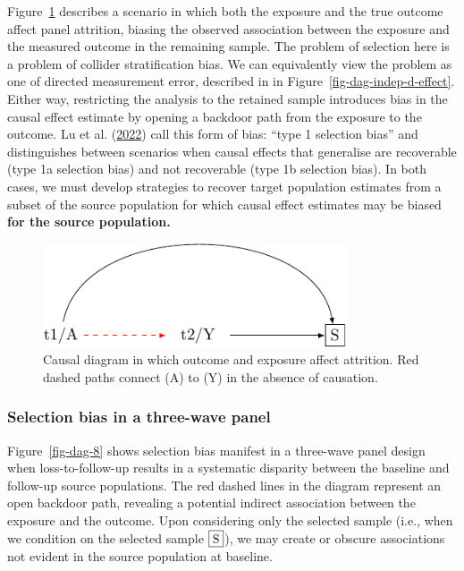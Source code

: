 \documentclass[
  singlecolumn]{article}
\begin{document}
Figure~\ref{fig-dag-8-5} describes a scenario in which both the exposure
and the true outcome affect panel attrition, biasing the observed
association between the exposure and the measured outcome in the
remaining sample. The problem of selection here is a problem of collider
stratification bias. We can equivalently view the problem as one of
directed measurement error, described in in
Figure~\ref{fig-dag-indep-d-effect}. Either way, restricting the
analysis to the retained sample introduces bias in the causal effect
estimate by opening a backdoor path from the exposure to the outcome. Lu
et al. (\protect\hyperlink{ref-lu2022}{2022}) call this form of bias:
``type 1 selection bias'' and distinguishes between scenarios when
causal effects that generalise are recoverable (type 1a selection bias)
and not recoverable (type 1b selection bias). In both cases, we must
develop strategies to recover target population estimates from a subset
of the source population for which causal effect estimates may be biased
\textbf{for the source population.}

\begin{figure}

{\centering \includegraphics[width=0.8\textwidth,height=\textheight]{causal-dags_files/figure-pdf/fig-dag-8-5-1.pdf}

}

\caption{\label{fig-dag-8-5}Causal diagram in which outcome and exposure
affect attrition. Red dashed paths connect (A) to (Y) in the absence of
causation.}

\end{figure}

\hypertarget{selection-bias-in-a-three-wave-panel}{%
\subsubsection{Selection bias in a three-wave
panel}\label{selection-bias-in-a-three-wave-panel}}

Figure~\ref{fig-dag-8} shows selection bias manifest in a three-wave
panel design when loss-to-follow-up results in a systematic disparity
between the baseline and follow-up source populations. The red dashed
lines in the diagram represent an open backdoor path, revealing a
potential indirect association between the exposure and the outcome.
Upon considering only the selected sample (i.e., when we condition on
the selected sample \(\framebox{S}\)), we may create or obscure
associations not evident in the source population at baseline.
\end{document}
